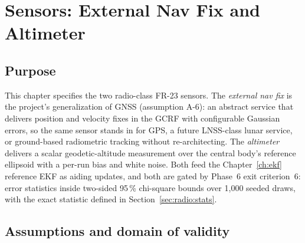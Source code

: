 \chapter{Sensors: External Nav Fix and Altimeter}
\label{ch:sensors-radio}

\section{Purpose}
\label{sec:radio:purpose}

This chapter specifies the two radio-class FR-23 sensors. The
\emph{external nav fix} is the project's generalization of GNSS
(assumption A-6): an abstract service that delivers position and
velocity fixes in the GCRF with configurable Gaussian errors, so the
same sensor stands in for GPS, a future LNSS-class lunar service, or
ground-based radiometric tracking without re-architecting. The
\emph{altimeter} delivers a scalar geodetic-altitude measurement over
the central body's reference ellipsoid with a per-run bias and white
noise. Both feed the Chapter~\ref{ch:ekf} reference EKF as aiding
updates, and both are gated by Phase~6 exit criterion~6: error
statistics inside two-sided 95\,\% chi-square bounds over 1{,}000 seeded
draws, with the exact statistic defined in
Section~\ref{sec:radio:stats}.

\section{Assumptions and domain of validity}
\label{sec:radio:domain}

